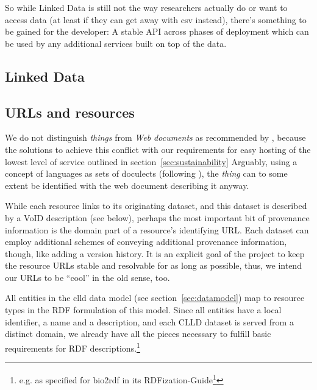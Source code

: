 \documentclass[a4paper,10pt]{article}
\begin{document}
So while Linked Data is still not the way researchers actually do or want to access data (at least if they can get away with csv instead), 
there's something to be gained for the developer: A stable API across phases of deployment which can be used by any additional services 
built on top of the data.


\subsection{Linked Data}

\subsection{URLs and resources}
We do not distinguish \emph{things} from \emph{Web documents} as recommended by , because the solutions to achieve this
conflict with our requirements for easy hosting of the lowest level of service outlined in section~\ref{sec:sustainability} 
Arguably, using a concept of languages as sets of doculects (following ), the \emph{thing} can to some extent be identified 
with the web document describing it anyway.

While each resource links to its originating
dataset, and this dataset is described by a VoID description (see below), perhaps the most important bit of provenance information is the domain part of 
a resource's identifying URL. Each dataset can employ additional schemes of conveying additional provenance information, though, like adding 
a version history.
It is an explicit goal of the project to keep the resource URLs stable and resolvable for as long as possible, thus, we intend our URLs to be ``cool'' in the old sense, too.

All entities in the clld data model (see section~\ref{sec:datamodel}) map to resource types in the RDF formulation of this model.
Since all entities have a local identifier, a name and a description, and each CLLD dataset is served from a distinct domain,
we already have all the pieces necessary to fulfill basic requirements for RDF descriptions.\footnote{e.g. as specified for bio2rdf in its
RDFization-Guide\footnote{https://github.com/bio2rdf/bio2rdf-scripts/wiki/RDFization-Guide}}
\end{document}
